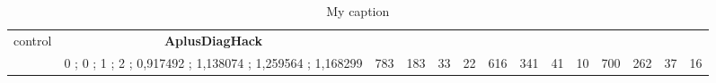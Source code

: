 \begin{table}[]
{\begin{tabular}{|c|c|c|c|c|c|c|c|c|c|c|c|c|c|}
control & \cellcolor{blue!15}\textbf{AplusDiagHack}& {\color[HTML]{00009B} } & {\color[HTML]{9A0000} } & {\color[HTML]{009901} } &  & {\color[HTML]{00009B} } & {\color[HTML]{9A0000} } & {\color[HTML]{009901} } &  & {\color[HTML]{00009B} } & {\color[HTML]{9A0000} } & {\color[HTML]{009901} } &  \\ 
 & \cellcolor{ blue!15}0 ; 0 ; 1 ; 2 ; 0,917492 ; 1,138074 ; 1,259564 ; 1,168299 & \multirow{-2}{*}{{\color[HTML]{00009B} 783}} & \multirow{-2}{*}{{\color[HTML]{9A0000} 183}} & \multirow{-2}{*}{{\color[HTML]{009901} 33}} & \multirow{-2}{*}{22} & \multirow{-2}{*}{{\color[HTML]{00009B} 616}} & \multirow{-2}{*}{{\color[HTML]{9A0000} 341}} & \multirow{-2}{*}{{\color[HTML]{009901} 41}} & \multirow{-2}{*}{10} & \multirow{-2}{*}{{\color[HTML]{00009B} 700}} & \multirow{-2}{*}{{\color[HTML]{9A0000} 262}} & \multirow{-2}{*}{{\color[HTML]{009901} 37}} & \multirow{-2}{*}{16} \\ \hline
\end{tabular}} \caption{ My caption} \label{ my - label} \end{table}

